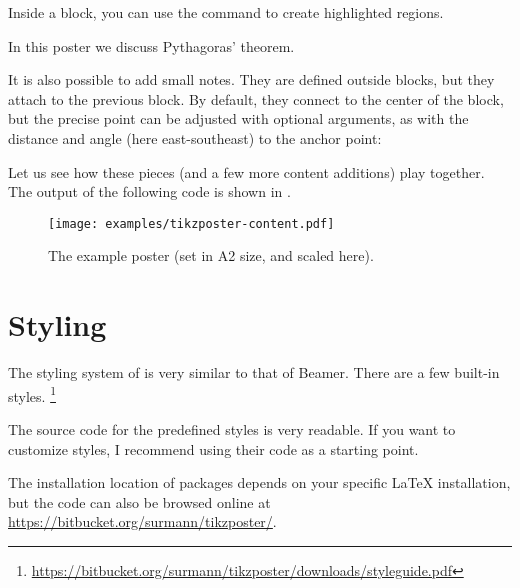 Inside a block, you can use the  command to create highlighted regions.
%
\begin{ExampleCode}
{
In this poster we discuss Pythagoras' theorem.


}
\end{ExampleCode}
%
It is also possible to add small notes.
They are defined outside blocks, but they attach to the previous block.
By default, they connect to the center of the block,
but the precise point can be adjusted with optional arguments,
as with the distance and angle (here east-southeast) to the anchor point:
%
\begin{ExampleCode}
\end{ExampleCode}

Let us see how these pieces (and a few more content additions) play together.
The output of the following code is shown in .

\begin{figure}
\centering
\texttt{[image: examples/tikzposter-content.pdf]}
\caption{The example poster (set in A2 size, and scaled here).}\label{fig:poster example}
\end{figure}





%
%
\section{Styling}\label{sec:poster style}

The styling system of  is very similar to that of Beamer.
There are a few built-in styles.%
\footnote{\url{https://bitbucket.org/surmann/tikzposter/downloads/styleguide.pdf}}


\begin{technote}
The source code for the predefined styles is very readable.
If you want to customize styles, I recommend using their code as a starting point.

The installation location of packages depends on your specific \LaTeX{} installation,
but the code can also be browsed online at \url{https://bitbucket.org/surmann/tikzposter/}.
\end{technote}


